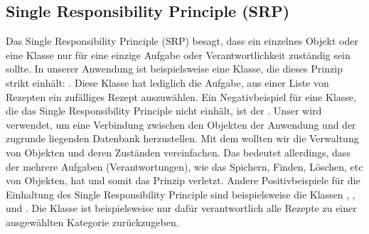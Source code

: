 \subsection{Single Responsibility Principle (SRP)}
Das Single Responsibility Principle (SRP) besagt, dass ein einzelnes Objekt oder eine Klasse nur für eine einzige Aufgabe oder Verantwortlichkeit zuständig sein  sollte.
In unserer Anwendung ist beispielsweise eine Klasse, die dieses Prinzip strikt einhält: \href{https://github.com/MichaelaHaag/RezeptApp/blob/main/1-Adapter/src/main/java/de/rezeptapp/adapter/GUIFunktionen/FunktionenZufallsGenerator.java}{}. Diese Klasse hat lediglich die Aufgabe, aus einer Liste von Rezepten ein \glqq zufälliges\grqq{} Rezept auszuwählen. 
Ein Negativbeispiel für eine Klasse, die das Single Responsibility Principle nicht einhält, ist der \href{https://github.com/MichaelaHaag/RezeptApp/blob/main/1-Adapter/src/main/java/de/rezeptapp/adapter/Datenpersistenz/EntityManager.java}{}. Unser  wird verwendet, um eine Verbindung zwischen den Objekten der Anwendung und der zugrunde liegenden Datenbank herzustellen. Mit dem  wollten wir die Verwaltung von Objekten und deren Zuständen vereinfachen. Das bedeutet allerdings, dass der  mehrere Aufgaben (Verantwortungen), wie das Spichern, Finden, Löschen, etc von Objekten, hat und somit das Prinzip verletzt. 
Andere Positivbeispiele für die Einhaltung des Single Responsibility Principle sind beispielsweise die Klassen \href{https://github.com/MichaelaHaag/RezeptApp/blob/main/1-Adapter/src/main/java/de/rezeptapp/adapter/GUIFunktionen/FunktionenRezeptBearbeiten.java}{}, \href{https://github.com/MichaelaHaag/RezeptApp/blob/main/1-Adapter/src/main/java/de/rezeptapp/adapter/GUIFunktionen/FunktionenNeuesRezept.java}{}, \href{https://github.com/MichaelaHaag/RezeptApp/blob/main/1-Adapter/src/main/java/de/rezeptapp/adapter/GUIFunktionen/ButtonRenderer.java}{} und \href{https://github.com/MichaelaHaag/RezeptApp/blob/main/1-Adapter/src/main/java/de/rezeptapp/adapter/GUIFunktionen/FunktionenListenÜbersicht.java}{}. Die Klasse  ist beispielsweise nur dafür verantwortlich alle Rezepte zu einer ausgewählten Kategorie zurückzugeben. 


